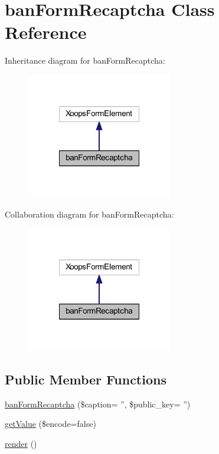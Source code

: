 \hypertarget{classban_form_recaptcha}{\section{ban\-Form\-Recaptcha Class Reference}
\label{classban_form_recaptcha}
}


Inheritance diagram for ban\-Form\-Recaptcha\-:
\nopagebreak
\begin{figure}[H]
\begin{center}
\leavevmode
\includegraphics[width=180pt]{classban_form_recaptcha__inherit__graph}
\end{center}
\end{figure}


Collaboration diagram for ban\-Form\-Recaptcha\-:
\nopagebreak
\begin{figure}[H]
\begin{center}
\leavevmode
\includegraphics[width=180pt]{classban_form_recaptcha__coll__graph}
\end{center}
\end{figure}
\subsection*{Public Member Functions}
\begin{DoxyCompactItemize}
\item 
\hyperlink{classban_form_recaptcha_a827c11632b940dd984baa66da18de27c}{ban\-Form\-Recaptcha} (\$caption= '', \$public\-\_\-key= '')
\item 
\hyperlink{classban_form_recaptcha_ab3c79e314dfd09da4de90fb2ce5eaa9d}{get\-Value} (\$encode=false)
\item 
\hyperlink{classban_form_recaptcha_afde88292c44dc59faf017738dae6dffb}{render} ()
\end{DoxyCompactItemize}
